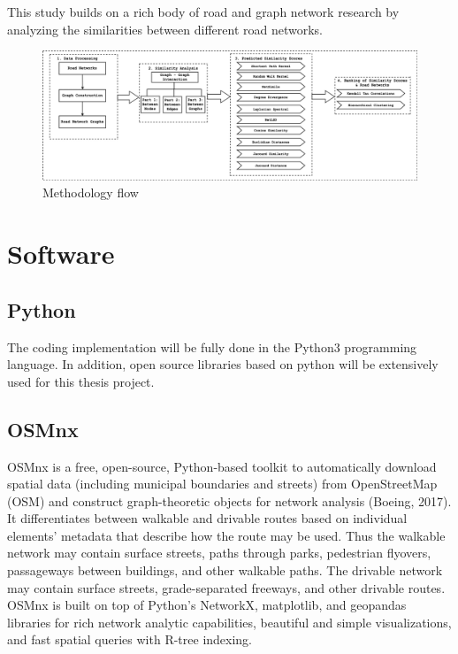 
This study builds on a rich body of road and graph network research by analyzing the similarities between different road networks.

\begin{figure}[h]
\centering
\includegraphics[width=1.25\textwidth,center]{picture/flows.png}
\caption[Miniaturtrichter]{Methodology flow}
\label{fig:flows}
\end{figure}

\section{Software}
\subsection{Python}
The coding implementation will be fully done in the Python3 programming language. In addition, open source libraries based on python will be extensively used for this thesis project.

\subsection{OSMnx}
OSMnx is a free, open-source, Python-based toolkit to automatically download spatial data (including municipal boundaries and streets) from OpenStreetMap (OSM) and construct graph-theoretic objects for network analysis (Boeing, 2017). It differentiates between walkable and drivable routes based on individual elements’ metadata that describe how the route may be used. Thus the walkable network may contain surface streets, paths through parks, pedestrian flyovers, passageways between buildings, and other walkable paths. The drivable network may contain surface streets, grade-separated freeways, and other drivable routes. OSMnx is built on top of Python's NetworkX, matplotlib, and geopandas libraries for rich network analytic capabilities, beautiful and simple visualizations, and fast spatial queries with R-tree indexing.

